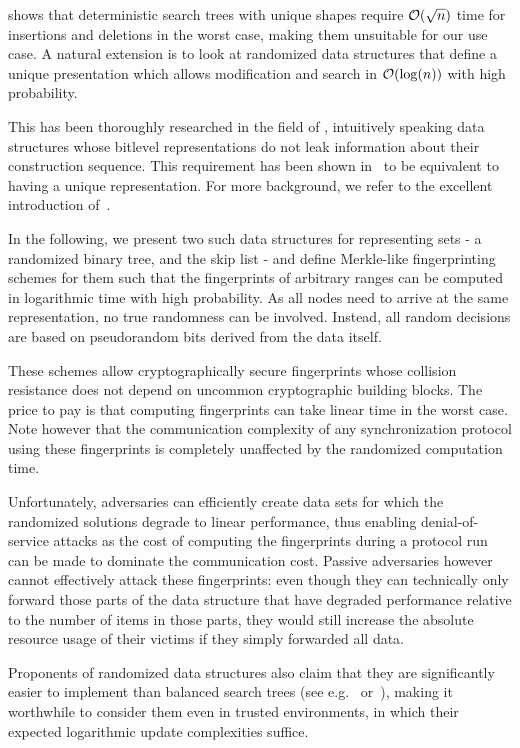 \cite{uniquerepresentation} shows that deterministic search trees with unique shapes require $\mathcal{O}(\sqrt{n})$ time for insertions and deletions in the worst case, making them unsuitable for our use case. A natural extension is to look at randomized data structures that define a unique presentation which allows modification and search in $\mathcal{O}(\log(n))$ with high probability.

This has been thoroughly researched in the field of , intuitively speaking data structures whose bitlevel representations do not leak information about their construction sequence. This requirement has been shown in~\cite{hartline2005characterizing} to be equivalent to having a unique representation. For more background, we refer to the excellent introduction of~\cite{bender2016anti}.

In the following, we present two such data structures for representing sets - a randomized binary tree, and the skip list - and define Merkle-like fingerprinting schemes for them such that the fingerprints of arbitrary ranges can be computed in logarithmic time with high probability. As all nodes need to arrive at the same representation, no true randomness can be involved. Instead, all random decisions are based on pseudorandom bits derived from the data itself.

These schemes allow cryptographically secure fingerprints whose collision resistance does not depend on uncommon cryptographic building blocks. The price to pay is that computing fingerprints can take linear time in the worst case. Note however that the communication complexity of any synchronization protocol using these fingerprints is completely unaffected by the randomized computation time.

Unfortunately, adversaries can efficiently create data sets for which the randomized solutions degrade to linear performance, thus enabling denial-of-service attacks as the cost of computing the fingerprints during a protocol run can be made to dominate the communication cost. Passive adversaries however cannot effectively attack these fingerprints: even though they can technically only forward those parts of the data structure that have degraded performance relative to the number of items in those parts, they would still increase the absolute resource usage of their victims if they simply forwarded all data.

Proponents of randomized data structures also claim that they are significantly easier to implement than balanced search trees (see e.g.~\cite{seidel1996randomized} or~\cite{pugh1990skip}), making it worthwhile to consider them even in trusted environments, in which their expected logarithmic update complexities suffice.

